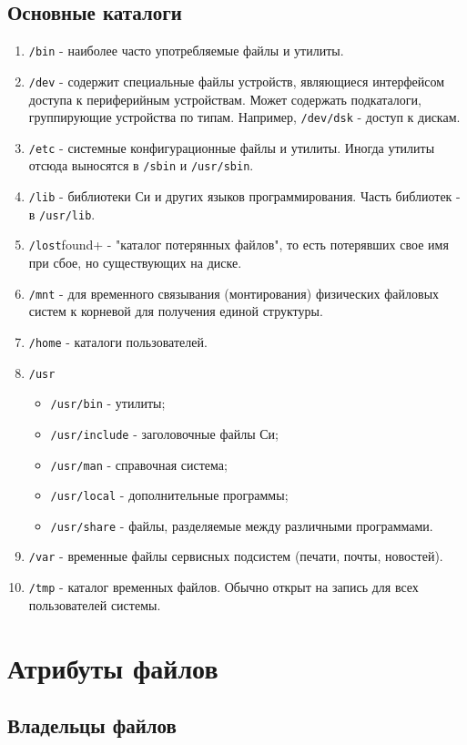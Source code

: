 \subsection{Основные каталоги}
\begin{enumerate}
\item \verb+/bin+ - наиболее часто употребляемые файлы и утилиты.
\item \verb+/dev+ - содержит специальные файлы устройств, являющиеся интерфейсом доступа к периферийным устройствам. Может содержать подкаталоги, группирующие устройства по типам. Например, \verb+/dev/dsk+ - доступ к дискам.
\item \verb+/etc+ - системные конфигурационные файлы и утилиты. Иногда утилиты отсюда выносятся в \verb+/sbin+ и \verb+/usr/sbin+.
\item \verb+/lib+ - библиотеки Си и других языков программирования. Часть библиотек - в \verb+/usr/lib+. 
\item \verb+/lost+found+ - "каталог потерянных файлов", то есть потерявших свое имя при сбое, но существующих на диске.
\item \verb+/mnt+ - для временного связывания (монтирования) физических файловых систем к корневой для получения единой структуры.
\item \verb+/home+ - каталоги пользователей.
\item \verb+/usr+ 
\begin{itemize} 
 \item \verb+/usr/bin+ - утилиты;
 \item \verb+/usr/include+ - заголовочные файлы Си;
 \item \verb+/usr/man+ - справочная система;
 \item \verb+/usr/local+ - дополнительные программы;
 \item \verb+/usr/share+ - файлы, разделяемые между различными  программами.	
\end{itemize}
\item \verb+/var+ - временные файлы сервисных подсистем (печати, почты, новостей).
\item \verb+/tmp+ - каталог временных файлов. Обычно открыт на запись для всех пользователей системы.
\end{enumerate}

\section{Атрибуты файлов}

\subsection{Владельцы файлов}

